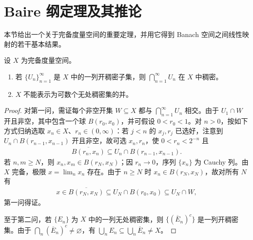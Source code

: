 \documentclass[../../main.tex]{subfiles}
\begin{document}
\section{Baire 纲定理及其推论}\label{section:ch05-baire-category}
本节给出一个关于完备度量空间的重要定理，并用它得到 Banach 空间之间线性映射的若干基本结果。
\begin{theorem}\label{theorem:ch05-baire-category}
设 $X$ 为完备度量空间。
\begin{enumerate}
\item\label{item:ch05-baire-dense-intersection} 若 $\{U_n\}_{n=1}^{\infty}$ 是 $X$ 中的一列开稠密子集，则 $\bigcap_{n=1}^{\infty}U_n$ 在 $X$ 中稠密。
\item\label{item:ch05-baire-not-meager} $X$ 不能表示为可数个无处稠密集的并。
\end{enumerate}
\end{theorem}
\begin{proof}
对第一问，需证每个非空开集 $W\subseteq X$ 都与 $\bigcap_{n=1}^{\infty}U_n$ 相交。由于 $U_1\cap W$ 开且非空，其中包含一个球 $B(r_0,x_0)$，并可假设 $0<r_0<1$。对 $n>0$，按如下方式归纳选取 $x_n\in X$、$r_n\in(0,\infty)$：若 $j<n$ 的 $x_j,r_j$ 已选好，注意到 $U_n\cap B(r_{n-1},x_{n-1})$ 开且非空，故可选 $x_n,r_n$，使 $0<r_n<2^{-n}$ 且
\begin{align*}
\overline{B(r_n,x_n)}\subseteq U_n\cap B(r_{n-1},x_{n-1}).
\end{align*}
若 $n,m\ge N$，则 $x_n,x_m\in B(r_N,x_N)$；因 $r_n\to0$，序列 $\{x_n\}$ 为 Cauchy 列。由 $X$ 完备，极限 $x=\lim_nx_n$ 存在。由于 $n\ge N$ 时 $x_n\in B(r_N,x_N)$，故对所有 $N$ 有
\begin{align*}
x\in\overline{B(r_N,x_N)}\subseteq U_N\cap B(r_0,x_0)\subseteq U_N\cap W,
\end{align*}
第一问得证。

至于第二问，若 $\{E_n\}$ 为 $X$ 中的一列无处稠密集，则 $\{(\overline E_n)^c\}$ 是一列开稠密集。由于 $\bigcap_n(\overline E_n)^c\ne\varnothing$，有 $\bigcup_nE_n\subseteq\bigcup_n\overline E_n\ne X$。
\end{proof}
\end{document}
